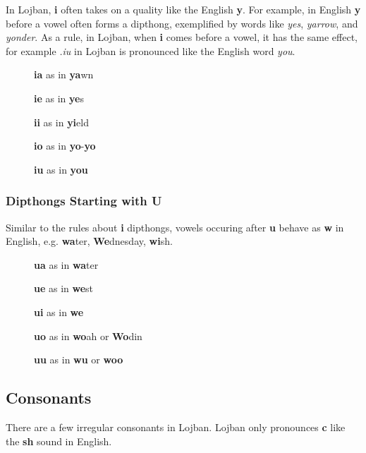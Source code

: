 \documentclass[12pt]{book}
\begin{document}
In Lojban, \textbf{i} often takes on a quality like the English \textbf{y}. For example, in English \textbf{y} before a vowel often forms a dipthong, exemplified by words like \emph{yes}, \emph{yarrow}, and \emph{yonder}. As a rule, in Lojban, when \textbf{i} comes before a vowel, it has the same effect, for example \emph{.iu} in Lojban is pronounced like the English word \emph{you}. 

\begin{description}
\item[ ] \textbf{ia} as in \textbf{ya}wn 
\item[ ] \textbf{ie} as in \textbf{ye}s 
\item[ ] \textbf{ii} as in \textbf{yi}eld 
\item[ ] \textbf{io} as in \textbf{yo}-\textbf{yo}
\item[ ] \textbf{iu} as in \textbf{you} 
\end{description}


\subsubsection{Dipthongs Starting with U}

Similar to the rules about \textbf{i} dipthongs, vowels occuring after \textbf{u} behave as \textbf{w} in English, e.g. \textbf{wa}ter, \textbf{We}dnesday, \textbf{wi}sh. 


\begin{description}
\item[ ] \textbf{ua} as in \textbf{wa}ter 
\item[ ] \textbf{ue} as in \textbf{we}st 
\item[ ] \textbf{ui} as in \textbf{we} 
\item[ ] \textbf{uo} as in \textbf{wo}ah or \textbf{Wo}din
\item[ ] \textbf{uu} as in \textbf{wu} or \textbf{woo} 
\end{description}


\subsection{Consonants}

There are a few irregular consonants in Lojban.
Lojban only pronounces \textbf{c} like the \textbf{sh} sound in English. 
\end{document}
